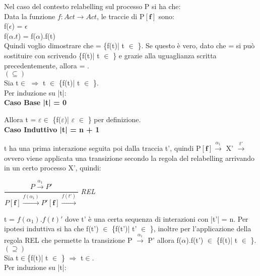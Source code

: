 Nel caso del contesto relabelling sul processo P si ha che:	\\	
Data la funzione $f: Act \rightarrow Act$, le traccie di P$\mathbf{[f]}$ sono:\\
f($\epsilon$) = $\epsilon$\\
f($\alpha.t$) =  f($\alpha$).f(t)\\
Quindi voglio dimostrare che  = \{f(t)| t $\in$ \}. Se questo è vero, dato che  =   si può sostituire  con  scrivendo \{f(t)| t $\in$ \} e grazie alla uguaglianza scritta precedentemente, allora  = . \\

$(\subseteq)$ \\

Sia t$\in$  $\Rightarrow$ t $\in$ \{f(t)| t $\in$ \}. \\
Per induzione su |t|:
\\

\textbf{Caso Base |t| = 0}

Allora t = $\varepsilon \in$ \{f($\varepsilon$)| $\varepsilon$ $\in$ \} per definizione.\\


\textbf{Caso Induttivo |t| = n + 1}

t ha una prima interazione seguita poi dalla traccia t', quindi P$\mathbf{[f]}  \overset{\alpha_{1}}\rightarrow $ X' $\overset{t'}\rightarrow$ ovvero viene applicata una transizione secondo la regola del relabelling arrivando in un certo processo X', quindi:

$\dfrac{P \overset{\alpha_{1}}\rightarrow P'}{P \mathbf{[f]} \overset{f(\alpha_{1})}\rightarrow P'\mathbf{[f]}\overset{f(t')}\rightarrow}$ \textit{REL} 

t = $f(\alpha_{1}).f(t)'$ dove t' è una certa sequenza di interazioni con |t'| = n. Per ipotesi induttiva si ha che f(t') $\in$ \{f(t')| t' $\in$ \}, inoltre per l'applicazione della regola REL che permette la transizione P $\overset{\alpha_{1}}\rightarrow$ P' allora f($\alpha$).f(t') $\in$ \{f(t)| t $\in$ \}.\\

$(\supseteq)$ \\

Sia t$\in$\{f(t)| t $\in$ \}  $\Rightarrow$ t$\in$. \\
Per induzione su |t|:\\

